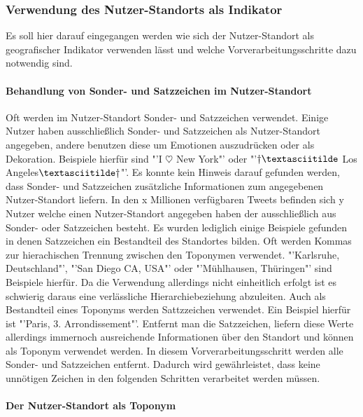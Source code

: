 					\subsubsection{Verwendung des Nutzer-Standorts als Indikator}

					Es soll hier darauf eingegangen werden wie sich der Nutzer-Standort als geografischer Indikator verwenden lässt und welche Vorverarbeitungsschritte dazu notwendig sind. 

					\paragraph{Behandlung von Sonder- und Satzzeichen im Nutzer-Standort}  

						Oft werden im Nutzer-Standort Sonder- und Satzzeichen verwendet. 
						Einige Nutzer haben ausschließlich Sonder- und Satzzeichen als Nutzer-Standort angegeben, andere benutzen diese um Emotionen auszudrücken oder als Dekoration. 
						Beispiele hierfür sind "'I $\heartsuit$ New York"' oder "'$\dagger\textasciitilde$ Los Angeles$\textasciitilde\dagger$"'.
						Es konnte kein Hinweis darauf gefunden werden, dass Sonder- und Satzzeichen zusätzliche Informationen zum angegebenen Nutzer-Standort liefern. 
						In den x Millionen verfügbaren Tweets befinden sich y Nutzer welche einen Nutzer-Standort angegeben haben der ausschließlich aus Sonder- oder Satzzeichen besteht. 
						Es wurden lediglich einige Beispiele gefunden in denen Satzzeichen ein Bestandteil des Standortes bilden.
						Oft werden Kommas zur hierachischen Trennung zwischen den Toponymen verwendet.
						"'Karlsruhe, Deutschland"', "'San Diego CA, USA"' oder "'Mühlhausen, Thüringen"' sind Beispiele hierfür.
						Da die Verwendung allerdings nicht einheitlich erfolgt ist es schwierig daraus eine verlässliche Hierarchiebeziehung abzuleiten.
						Auch als Bestandteil eines Toponyms werden Sattzzeichen verwendet.
						Ein Beispiel hierfür ist "'Paris, 3. Arrondissement"'.
						Entfernt man die Satzzeichen, liefern diese Werte allerdings immernoch ausreichende Informationen über den Standort und können als Toponym verwendet werden.  
						In diesem Vorverarbeitungsschritt werden alle Sonder- und Satzzeichen entfernt. 
						Dadurch wird gewährleistet, dass keine unnötigen Zeichen in den folgenden Schritten verarbeitet werden müssen. 

					\paragraph{Der Nutzer-Standort als Toponym} 

